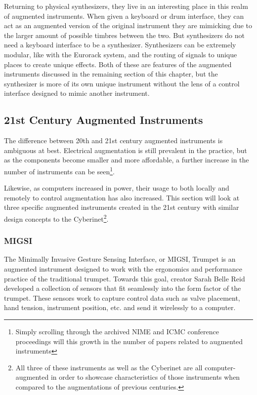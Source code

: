 Returning to physical synthesizers, they live in an interesting place in this realm of augmented instruments. When given a keyboard or drum interface, they can act as an augmented version of the original instrument they are mimicking due to the larger amount of possible timbres between the two. But synthesizers do not need a keyboard interface to be a synthesizer. Synthesizers can be extremely modular, like with the Eurorack system, and the routing of signals to unique places to create unique effects. Both of these are features of the augmented instruments discussed in the remaining section of this chapter, but the synthesizer is more of its own unique instrument without the lens of a control interface designed to mimic another instrument. %

\subsection{21st Century Augmented Instruments}
The difference between 20th and 21st century augmented instruments is ambiguous at best. Electrical augmentation is still prevalent in the practice, but as the components become smaller and more affordable, a further increase in the number of instruments can be seen\footnote{Simply scrolling through the archived NIME and ICMC conference  proceedings will this growth in the number of papers related to augmented instruments}. 

Likewise, as computers increased in power, their usage to both locally and remotely to control augmentation has also increased. This section will look at three specific augmented instruments created in the 21st century with similar design concepts to the Cyberinet\footnote{All three of these instruments as well as the Cyberinet are all computer-augmented in order to showcase characteristics of those instruments when compared to the augmentations of previous centuries.}. 

\subsubsection{MIGSI}

The Minimally Invasive Gesture Sensing Interface, or MIGSI, Trumpet is an augmented instrument designed to work with the ergonomics and performance practice of the traditional trumpet\cite{reid2016}. Towards this goal, creator Sarah Belle Reid developed a collection of sensors that fit seamlessly into the form factor of the trumpet. These sensors work to capture control data such as valve placement, hand tension, instrument position, etc. and send it wirelessly to a computer.

